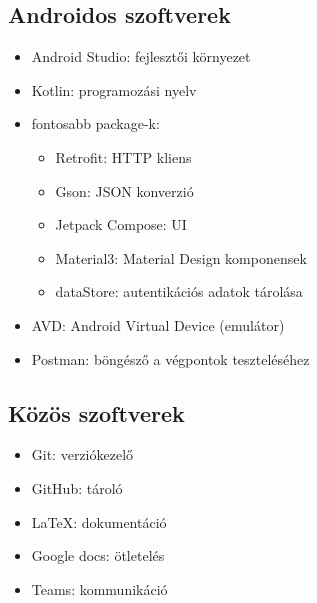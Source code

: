 \subsection{Androidos szoftverek}
\begin{itemize}
    \item Android Studio: fejlesztői környezet
    \item Kotlin: programozási nyelv
    \item fontosabb package-k:
    \begin{itemize}
        \item Retrofit: HTTP kliens
        \item Gson: JSON konverzió
        \item Jetpack Compose: UI
        \item Material3: Material Design komponensek
        \item dataStore: autentikációs adatok tárolása
    \end{itemize}
    \item AVD: Android Virtual Device (emulátor)
    \item Postman: böngésző a végpontok teszteléséhez

\end{itemize}

\subsection{Közös szoftverek}
\begin{itemize}
    \item Git: verziókezelő
    \item GitHub: tároló
    \item LaTeX: dokumentáció
    \item Google docs: ötletelés
    \item Teams: kommunikáció
\end{itemize}